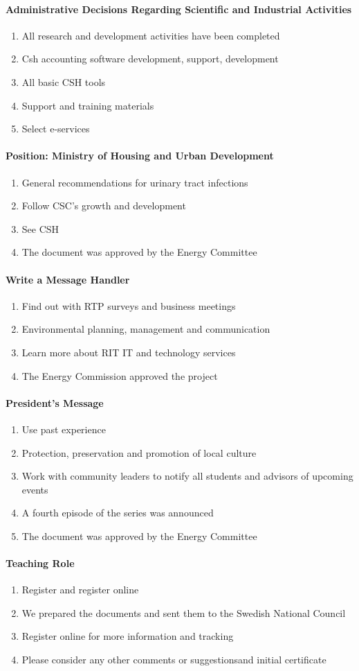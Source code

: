 \documentclass{article}
\newcommand{\asubsubsection}[1]{\paragraph{#1} \label{#1}}
\begin{document}
\asubsubsection{Administrative Decisions Regarding Scientific and Industrial Activities}
\begin{enumerate}
	\item All research and development activities have been completed
	\item Csh accounting software development, support, development
	\item All basic CSH tools
	\item Support and training materials
	\item Select e-services
\end{enumerate}

\asubsubsection{Position: Ministry of Housing and Urban Development}
\begin{enumerate}
	\item General recommendations for urinary tract infections
	\item Follow CSC's growth and development
	\item See CSH
	\item The document was approved by the Energy Committee
\end{enumerate}

\asubsubsection{Write a Message Handler}
\begin{enumerate}
	\item Find out with RTP surveys and business meetings
	\item Environmental planning, management and communication
	\item Learn more about RIT IT and technology services
	\item The Energy Commission approved the project
\end{enumerate}

\asubsubsection{President's Message}
\begin{enumerate}
	\item Use past experience
	\item Protection, preservation and promotion of local culture
	\item Work with community leaders to notify all students and advisors of upcoming events
	\item A fourth episode of the series was announced
	\item The document was approved by the Energy Committee
\end{enumerate}

\asubsubsection{Teaching Role}
\begin{enumerate}
	\item Register and register online
	\item We prepared the documents and sent them to the Swedish National Council
	\item Register online for more information and tracking
	\item Please consider any other comments or suggestionsand initial certificate
\end{enumerate}
\end{document}
